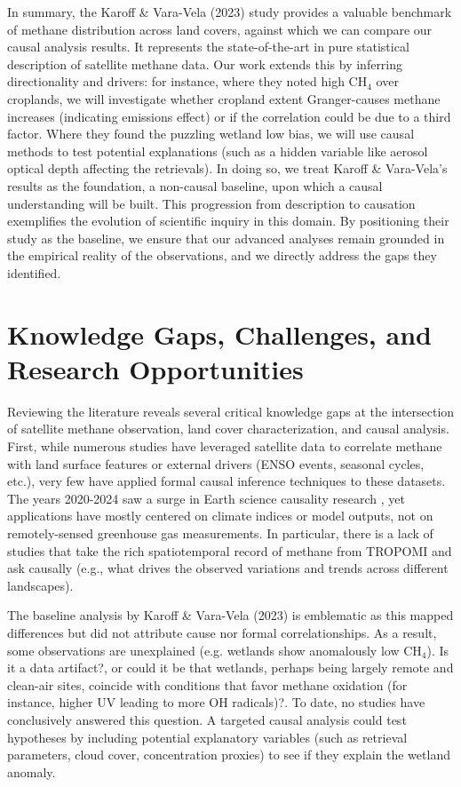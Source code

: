 In summary, the Karoff \& Vara-Vela (2023) study provides a valuable benchmark of methane distribution across land covers, against which we can compare our causal analysis results. It represents the state-of-the-art in pure statistical description of satellite methane data. Our work extends this by inferring directionality and drivers: for instance, where they noted high CH$_4$ over croplands, we will investigate whether cropland extent Granger-causes methane increases (indicating emissions effect) or if the correlation could be due to a third factor. Where they found the puzzling wetland low bias, we will use causal methods to test potential explanations (such as a hidden variable like aerosol optical depth affecting the retrievals). In doing so, we treat Karoff \& Vara-Vela's results as the foundation, a non-causal baseline, upon which a causal understanding will be built. This progression from description to causation exemplifies the evolution of scientific inquiry in this domain. By positioning their study as the baseline, we ensure that our advanced analyses remain grounded in the empirical reality of the observations, and we directly address the gaps they identified.


\section{Knowledge Gaps, Challenges, and Research Opportunities}

Reviewing the literature reveals several critical knowledge gaps at the intersection of satellite methane observation, land cover characterization, and causal analysis. First, while numerous studies have leveraged satellite data to correlate methane with land surface features or external drivers (ENSO events, seasonal cycles, etc.), very few have applied formal causal inference techniques to these datasets. The years 2020-2024 saw a surge in Earth science causality research \cite{Runge2019}, yet applications have mostly centered on climate indices or model outputs, not on remotely-sensed greenhouse gas measurements. In particular, there is a lack of studies that take the rich spatiotemporal record of methane from TROPOMI and ask causally (e.g., what drives the observed variations and trends across different landscapes). 

The baseline analysis by Karoff \& Vara-Vela (2023) \cite{Karoff2023} is emblematic as this mapped differences but did not attribute cause nor formal correlationships. As a result, some observations are unexplained (e.g. wetlands show anomalously low CH$_4$). Is it a data artifact?, or could it be that wetlands, perhaps being largely remote and clean-air sites, coincide with conditions that favor methane oxidation (for instance, higher UV leading to more OH radicals)?. To date, no studies have conclusively answered this question. A targeted causal analysis could test hypotheses by including potential explanatory variables (such as retrieval parameters, cloud cover,  concentration proxies) to see if they explain the wetland anomaly.

